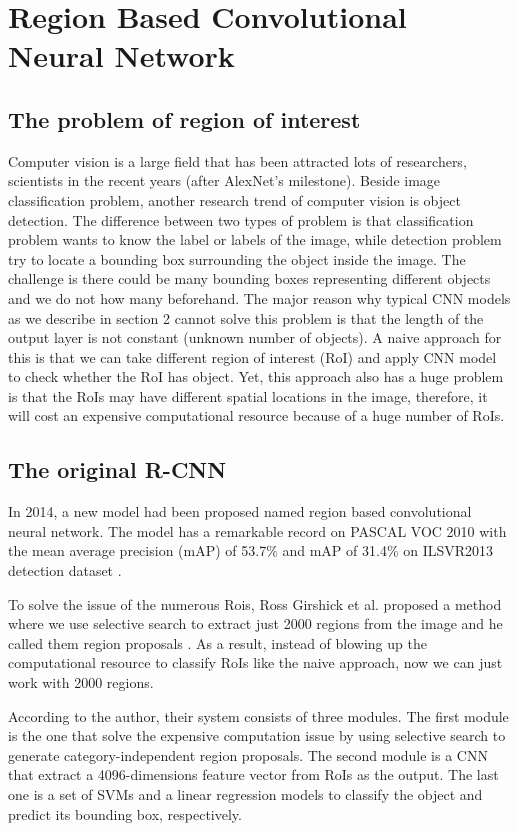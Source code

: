 \chapter{Region Based Convolutional Neural Network}
\section{The problem of region of interest}
\label{section:problemofROI}
\noindent
	Computer vision is a large field that has been attracted lots of researchers, scientists in the recent years (after AlexNet’s milestone). Beside image classification problem, another research trend of computer vision is object detection. The difference between two types of problem is that classification problem wants to know the label or labels of the image, while detection problem try to locate a bounding box surrounding the object inside the image. The challenge is there could be many bounding boxes representing different objects and we do not how many beforehand. The major reason why typical CNN models as we describe in section 2 cannot solve this problem is that the length of the output layer is not constant (unknown number of objects). A naive approach for this is that we can take different region of interest (RoI) and apply CNN model to check whether the RoI has object. Yet, this approach also has a huge problem is that the RoIs may have different spatial locations in the image, therefore, it will cost an expensive computational resource because of a huge number of RoIs.
	
\section{The original R-CNN}
\label{section:rcnn}
\noindent

	In 2014, a new model had been proposed named region based convolutional neural network. The model has a remarkable record on PASCAL VOC 2010 with the mean average precision (mAP) of 53.7\% and mAP of 31.4\% on ILSVR2013 detection dataset \cite{rcnn}.
	
	To solve the issue of the numerous Rois, Ross Girshick et al. proposed a method where we use selective search to extract just 2000 regions from the image and he called them region proposals \cite{rcnn}. As a result, instead of blowing up the computational resource to classify RoIs like the naive approach, now we can just work with 2000 regions.
	
	According to the author, their system consists of three modules. The first module is the one that solve the expensive computation issue by using selective search to generate category-independent region proposals. The second module is a CNN that extract a 4096-dimensions feature vector from RoIs as the output. The last one is a set of SVMs and a linear regression models to classify the object and predict its bounding box, respectively.
	

